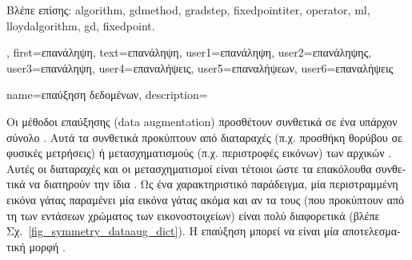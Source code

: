 {{\begin{figure}[H]
		\end{figure} 
		\foreignlanguage{greek}{Βλέπε επίσης:} \gls{algorithm}, \gls{gdmethod}, \gls{gradstep}, \gls{fixedpointiter}, \gls{operator}, \gls{ml}, \gls{lloydalgorithm}, 
		\gls{gd}, \gls{fixedpoint}. },
	first={\foreignlanguage{greek}{επανάληψη}},
	text={\foreignlanguage{greek}{επανάληψη}},
	user1={\foreignlanguage{greek}{επανάληψη}}, %
  	user2={\foreignlanguage{greek}{επανάληψης}}, %
	user3={\foreignlanguage{greek}{επανάληψη}}, %
	user4={\foreignlanguage{greek}{επαναλήψεις}}, %
  	user5={\foreignlanguage{greek}{επαναλήψεων}}, %
	user6={\foreignlanguage{greek}{επαναλήψεις}} %
}

{name={\foreignlanguage{greek}{επαύξηση δεδομένων}},
	description={\foreignlanguage{greek}{Οι μέθοδοι επαύξησης}  
		(data augmentation) \foreignlanguage{greek}{προσθέτουν συνθετικά}  \foreignlanguage{greek}{σε ένα υπάρχον σύνολο}
		. \foreignlanguage{greek}{Αυτά τα συνθετικά}  \foreignlanguage{greek}{προκύπτουν από 
		διαταραχές (π.χ. προσθήκη θορύβου σε φυσικές μετρήσεις) ή μετασχηματισμούς (π.χ. περιστροφές εικόνων) των αρχικών} 
		. \foreignlanguage{greek}{Αυτές οι διαταραχές και οι μετασχηματισμοί είναι τέτοιοι ώστε τα επακόλουθα συνθετικά}
		 \foreignlanguage{greek}{να διατηρούν την ίδια} . \foreignlanguage{greek}{Ως ένα χαρακτηριστικό 
		παράδειγμα, μία περιστραμμένη εικόνα γάτας παραμένει μία εικόνα γάτας ακόμα και αν τα}  
		\foreignlanguage{greek}{τους (που προκύπτουν από τη}  \foreignlanguage{greek}{των εντάσεων χρώματος των 
		εικονοστοιχείων) είναι πολύ διαφορετικά (βλέπε Σχ.}\ \ref{fig_symmetry_dataaug_dict}). \foreignlanguage{greek}{Η επαύξηση}  
		\foreignlanguage{greek}{μπορεί να είναι μία αποτελεσματική μορφή} .
		\begin{figure}[H]
		\begin{center}
\end{center}
\end{figure}}}
